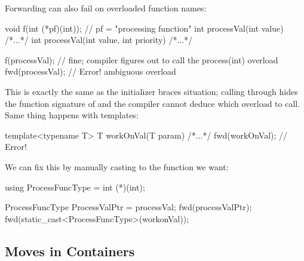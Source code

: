 Forwarding can also fail on overloaded function names:
\begin{cppcode}
void f(int (*pf)(int)); // pf = "processing function"
int processVal(int value) { /*...*/ }
int processVal(int value, int priority) { /*...*/ }

f(processVal); // fine; compiler figures out to call the process(int) overload
fwd(processVal); // Error! ambiguous overload
\end{cppcode}
This is exactly the same as the initializer braces situation; calling through  hides the function signature of  and the compiler cannot deduce which overload to call.\\
Same thing happens with templates:
\begin{cppcode}
template<typename T>
T workOnVal(T param) { /*...*/ }
fwd(workOnVal); // Error!
\end{cppcode}
We can fix this by manually casting to the function we want:
\begin{cppcode}
using ProcessFuncType = int (*)(int);

ProcessFuncType ProcessValPtr = processVal;
fwd(processValPtr);
fwd(static_cast<ProcessFuncType>(workonVal));
\end{cppcode}

\subsection{Moves in Containers}
